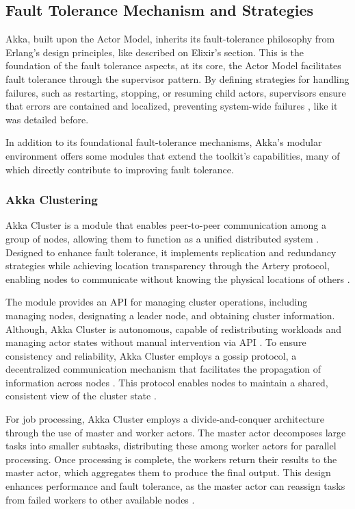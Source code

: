 \subsection{Fault Tolerance Mechanism and Strategies}

Akka, built upon the Actor Model, inherits its fault-tolerance philosophy from Erlang’s design principles, like described on Elixir's section. This is the foundation of the fault tolerance aspects, at its core, the Actor Model facilitates fault tolerance through the supervisor pattern. By defining strategies for handling failures, such as restarting, stopping, or resuming child actors, supervisors ensure that errors are contained and localized, preventing system-wide failures \cite{akka-docs,Abraham2023,Juric2024}, like it was detailed before.

In addition to its foundational fault-tolerance mechanisms, Akka’s modular environment offers some modules that extend the toolkit’s capabilities, many of which directly contribute to improving fault tolerance.

\subsubsection{Akka Clustering}

Akka Cluster is a module that enables peer-to-peer communication among a group of nodes, allowing them to function as a unified distributed system \cite{Moradi2023,akka-docs}. Designed to enhance fault tolerance, it implements replication and redundancy strategies while achieving location transparency through the Artery protocol, enabling nodes to communicate without knowing the physical locations of others \cite{Abraham2023}.

The module provides an API for managing cluster operations, including managing nodes, designating a leader node, and obtaining cluster information. Although, Akka Cluster is autonomous, capable of redistributing workloads and managing actor states without manual intervention via API \cite{Abraham2023}. To ensure consistency and reliability, Akka Cluster employs a gossip protocol, a decentralized communication mechanism that facilitates the propagation of information across nodes \cite{Tanenbaum2023,akka-docs}. This protocol enables nodes to maintain a shared, consistent view of the cluster state \cite{Tanenbaum2023}.

For job processing, Akka Cluster employs a divide-and-conquer architecture through the use of master and worker actors. The master actor decomposes large tasks into smaller subtasks, distributing these among worker actors for parallel processing. Once processing is complete, the workers return their results to the master actor, which aggregates them to produce the final output. This design enhances performance and fault tolerance, as the master actor can reassign tasks from failed workers to other available nodes \cite{akka-docs}.

